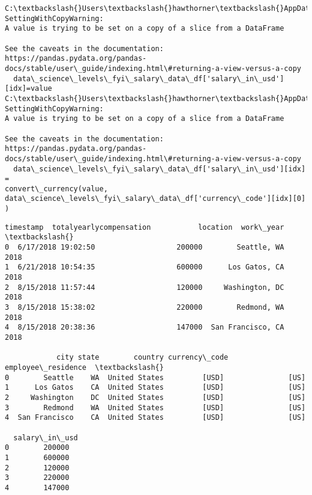 \documentclass[11pt]{article}
\begin{document}
    \begin{Verbatim}[commandchars=\\\{\}]
C:\textbackslash{}Users\textbackslash{}hawthorner\textbackslash{}AppData\textbackslash{}Local\textbackslash{}Temp\textbackslash{}ipykernel\_22188\textbackslash{}3728537373.py:8:
SettingWithCopyWarning:
A value is trying to be set on a copy of a slice from a DataFrame

See the caveats in the documentation: https://pandas.pydata.org/pandas-
docs/stable/user\_guide/indexing.html\#returning-a-view-versus-a-copy
  data\_science\_levels\_fyi\_salary\_data\_df['salary\_in\_usd'][idx]=value
C:\textbackslash{}Users\textbackslash{}hawthorner\textbackslash{}AppData\textbackslash{}Local\textbackslash{}Temp\textbackslash{}ipykernel\_22188\textbackslash{}3728537373.py:6:
SettingWithCopyWarning:
A value is trying to be set on a copy of a slice from a DataFrame

See the caveats in the documentation: https://pandas.pydata.org/pandas-
docs/stable/user\_guide/indexing.html\#returning-a-view-versus-a-copy
  data\_science\_levels\_fyi\_salary\_data\_df['salary\_in\_usd'][idx] =
convert\_currency(value,
data\_science\_levels\_fyi\_salary\_data\_df['currency\_code'][idx][0] )
    \end{Verbatim}

    \begin{Verbatim}[commandchars=\\\{\}]
            timestamp  totalyearlycompensation           location  work\_year  \textbackslash{}
0  6/17/2018 19:02:50                   200000        Seattle, WA       2018
1  6/21/2018 10:54:35                   600000      Los Gatos, CA       2018
2  8/15/2018 11:57:44                   120000     Washington, DC       2018
3  8/15/2018 15:38:02                   220000        Redmond, WA       2018
4  8/15/2018 20:38:36                   147000  San Francisco, CA       2018

            city state        country currency\_code employee\_residence  \textbackslash{}
0        Seattle    WA  United States         [USD]               [US]
1      Los Gatos    CA  United States         [USD]               [US]
2     Washington    DC  United States         [USD]               [US]
3        Redmond    WA  United States         [USD]               [US]
4  San Francisco    CA  United States         [USD]               [US]

  salary\_in\_usd
0        200000
1        600000
2        120000
3        220000
4        147000
    \end{Verbatim}
\end{document}
